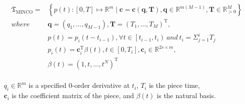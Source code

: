 \documentclass{article}
\begin{document}
\newpage

$$
\begin{aligned}
\mathfrak{T}_{\text {MINCO}} =&
\left\{ p(t):[0, T] \mapsto \mathbb{R}^{m} 
\mid 
\mathbf{c}=\mathbf{c}(\mathbf{q}, \mathbf{T}), 
\mathbf{q} \in \mathbb{R}^{m(M-1)}, 
\mathbf{T} \in \mathbb{R}_{>0}^{M}
\right\}\\
where \quad
&\mathbf{q}=\left(q_{1}, \ldots, q_{M-1}\right), 
\mathbf{T}=\left(T_{1}, \ldots, T_{M}\right)^{\mathrm{T}},\\
&p(t)=p_{i}\left(t-t_{i-1}\right), 
\forall t \in\left[t_{i-1}, t_{i}\right)\ and\ t_{i}=\Sigma_{j=1}^{i} T_{j} \\
&p_{i}(t) =  \mathbf{c}_{i}^{\mathrm{T}} \beta(t), t \in\left[0, T_{i}\right], 
\mathbf{c}_{i} \in \mathbb{R}^{2 s \times m},\\
&\beta(t)=\left(1, t, \ldots, t^{N}\right)^{\mathrm{T}}
\end{aligned}
$$
\\
$q_i\in \mathbb{R}^m$ is a specified 0-order derivative at $t_i$,
$T_{i}$ is the piece time, \\
$\mathbf{c}_{i}$ is the coefficient matrix of the piece,
and $\beta(t)$ is the natural basis.\\
\end{document}
